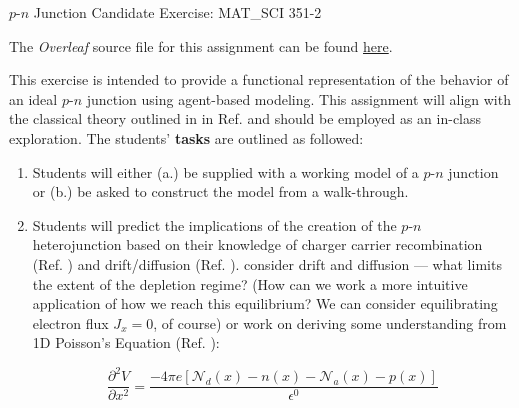 \documentclass[12pt]{exam}
\begin{document}
			
{\Large \textcolor{NUpurp120}{$p$-$n$ Junction Candidate Exercise: MAT\_SCI 351-2}}

The \textit{Overleaf} source file for this assignment can be found \href{https://www.overleaf.com/project/5d2e1528f9cbf23df672e1f3}{here}.
\medskip

This exercise is intended to provide a functional representation of the behavior of an ideal $p$-$n$ junction using agent-based modeling. This assignment will align with the classical theory outlined in  in Ref. \cite{Kasap:2005:PEM:1594045} and should be employed as an in-class exploration. The students' \textbf{tasks} are outlined as followed:

\begin{enumerate}
    \item Students will either (a.) be supplied with a working model of a $p$-$n$ junction or (b.) be asked to construct the model from a walk-through.
    \item Students will predict the implications of the creation of the $p$-$n$ heterojunction based on their knowledge of charger carrier recombination (Ref. \cite{Kasap:2005:PEM:1594045} ) and drift/diffusion (Ref. \cite{Kasap:2005:PEM:1594045} ). consider drift and diffusion --- what limits the extent of the depletion regime? (How can we work a more intuitive application of how we reach this equilibrium? We can consider equilibrating electron flux $J_x = 0$, of course) or work on deriving some understanding from 1D Poisson's Equation (Ref. \cite{marder2010condensed}):
    
    \begin{equation*}
        \frac{\partial^2V}{\partial x^2} = \frac{-4 \pi e \left[ \mathcal{N}_d(x) -n(x) -\mathcal{N}_a(x) - p(x)\right]}{\epsilon^0}
    \end{equation*}
    

\end{enumerate}
\end{document}

